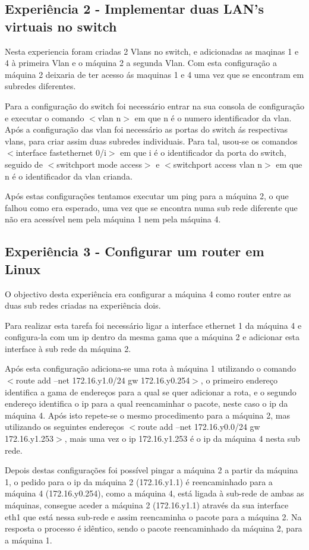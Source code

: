 \documentclass[a4paper]{article}
\begin{document}
\subsection{Experiência 2 - Implementar duas LAN's virtuais no switch}
Nesta experiencia foram criadas 2 Vlans no switch, e adicionadas as maqinas 1 e 4 à primeira Vlan e o máquina 2 a segunda Vlan. Com esta configuração a máquina 2 deixaria de ter acesso ás maquinas 1 e 4 uma vez que se encontram em subredes diferentes.


Para a configuração do switch foi necessário entrar na  sua consola de configuração e executar o comando $<$vlan n$>$ em que n é o numero identificador da vlan. Após a configuração das vlan foi necessário as portas do switch ás respectivas vlans, para criar assim duas subredes individuais. Para tal, usou-se os comandos $<$interface fastethernet 0/i$>$ em que i é o identificador da porta do switch, seguido de $<$switchport mode access$>$ e $<$switchport access vlan n$>$ em que n é o identificador da vlan crianda.


Após estas configurações tentamos executar um ping para a máquina 2, o que falhou como era esperado, uma vez que se encontra numa sub rede diferente que não era acessível nem pela máquina 1 nem pela máquina 4.

\subsection{Experiência 3 - Configurar um router em Linux}
O objectivo desta experiência era configurar a máquina 4 como router entre as duas sub redes criadas na experiência dois.

Para realizar esta tarefa foi necessário ligar a interface ethernet 1 da máquina 4 e configura-la com um ip dentro da mesma gama que a máquina 2 e adicionar esta interface à sub rede da máquina 2.

Após esta configuração adiciona-se uma rota à máquina 1 utilizando o comando $<$route add –net  172.16.y1.0/24 gw 172.16.y0.254$>$, o primeiro endereço identifica a gama de endereços para a qual se quer adicionar a rota, e o segundo endereço identifica o ip para a qual reencaminhar o pacote, neste caso o ip da máquina 4. Após isto repete-se o mesmo procedimento para a máquina 2, mas utilizando os seguintes endereços $<$route add –net 172.16.y0.0/24 gw 172.16.y1.253$>$, mais uma vez o ip 172.16.y1.253 é o ip da máquina 4 nesta sub rede.

Depois destas configurações foi possível pingar a máquina 2 a partir da máquina 1, o pedido para o ip da máquina 2 (172.16.y1.1) é reencaminhado para a máquina 4 (172.16.y0.254), como a máquina 4, está ligada à sub-rede de ambas as máquinas, consegue aceder a máquina 2 (172.16.y1.1) através da sua interface eth1 que está nessa sub-rede e assim reencaminha o pacote para a máquina 2. Na resposta o processo é idêntico, sendo o pacote reencaminhado da máquina 2, para a máquina 1.
\end{document}
